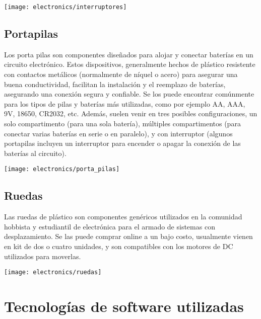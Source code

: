 \begin{center}
  \centering
  \texttt{[image: electronics/interruptores]}
  \label{fig:interruptores}
\end{center}

\subsection{Portapilas}

Los porta pilas son componentes diseñados para alojar y conectar baterías en un circuito electrónico. Estos dispositivos, generalmente hechos de plástico resistente con contactos metálicos (normalmente de níquel o acero) para asegurar una buena conductividad, facilitan la instalación y el reemplazo de baterías, asegurando una conexión segura y confiable. Se los puede encontrar comúnmente para los tipos de pilas y baterías más utilizadas, como por ejemplo AA, AAA, 9V, 18650, CR2032, etc. Además, suelen venir en tres posibles configuraciones, un solo compartimento (para una sola batería), múltiples compartimentos (para conectar varias baterías en serie o en paralelo), y con interruptor (algunos portapilas incluyen un interruptor para encender o apagar la conexión de las baterías al circuito).

\begin{center}
  \centering
  \texttt{[image: electronics/porta\_pilas]}
  \label{fig:porta_pilas}
\end{center}

\subsection{Ruedas}

Las ruedas de plástico son componentes genéricos utilizados en la comunidad hobbista y estudiantil de electrónica para el armado de sistemas con desplazamiento. Se las puede comprar online a un bajo costo, usualmente vienen en kit de dos o cuatro unidades, y son compatibles con los motores de DC utilizados para moverlas.

\begin{center}
  \centering
  \texttt{[image: electronics/ruedas]}
  \label{fig:ruedas}
\end{center}

\section{Tecnologías de software utilizadas}

